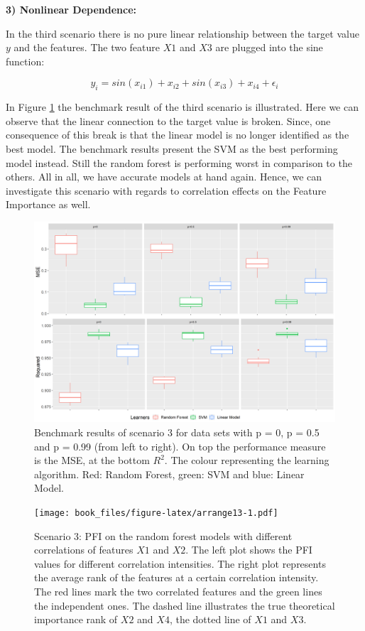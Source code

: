\documentclass[
]{krantz}
\begin{document}
\textbf{3) Nonlinear Dependence:}

In the third scenario there is no pure linear relationship between the target value \(y\) and the features. The two feature \(X1\) and \(X3\) are plugged into the sine function:

\[
y_{i} = sin(x_{i1})+x_{i2}+sin(x_{i3})+x_{i4}+\epsilon_{i}
\]

In Figure \ref{fig:bmr04} the benchmark result of the third scenario is illustrated. Here we can observe that the linear connection to the target value is broken. Since, one consequence of this break is that the linear model is no longer identified as the best model. The benchmark results present the SVM as the best performing model instead. Still the random forest is performing worst in comparison to the others. All in all, we have accurate models at hand again. Hence, we can investigate this scenario with regards to correlation effects on the Feature Importance as well.

\begin{figure}

{\centering \includegraphics[width=1\linewidth]{images/bmr04} 

}

\caption{Benchmark results of scenario 3 for data sets with p = 0, p = 0.5 and p = 0.99 (from left to right). On top the performance measure is the MSE, at the bottom $R^2$. The colour representing the learning algorithm. Red: Random Forest, green: SVM and blue: Linear Model. }\label{fig:bmr04}
\end{figure}

\begin{figure}
\centering
\texttt{[image: book\_files/figure-latex/arrange13-1.pdf]}
\caption{\label{fig:arrange13}Scenario 3: PFI on the random forest models with different correlations of features \(X1\) and \(X2\). The left plot shows the PFI values for different correlation intensities. The right plot represents the average rank of the features at a certain correlation intensity. The red lines mark the two correlated features and the green lines the independent ones. The dashed line illustrates the true theoretical importance rank of \(X2\) and \(X4\), the dotted line of \(X1\) and \(X3\).}
\end{figure}
\end{document}
